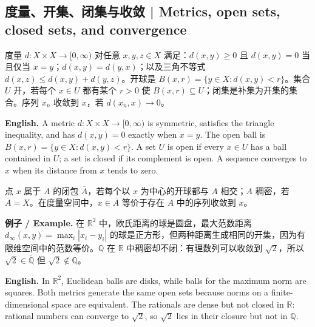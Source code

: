 \documentclass[UTF8,11pt,a4paper]{ctexart}
\newcommand{\EN}[1]{\par\noindent\textbf{English.} #1\par}
\let\APSsubsection\subsection
\renewcommand{\subsection}[1]{\Needspace{6\baselineskip}\APSsubsection{#1}}
\newcommand{\EX}[2]{\par\noindent\textbf{例子 / Example.} #1\par\EN{#2}}
\begin{document}
\subsection{度量、开集、闭集与收敛 | Metrics, open sets, closed sets, and convergence}
\noindent 度量 $d:X\times X\to[0,\infty)$ 对任意 $x,y,z\in X$ 满足：$d(x,y)\ge0$ 且 $d(x,y)=0$ 当且仅当 $x=y$；$d(x,y)=d(y,x)$；以及三角不等式 $d(x,z)\le d(x,y)+d(y,z)$。开球是 $B(x,r)=\{y\in X:d(x,y)<r\}$。集合 $U$ 开，若每个 $x\in U$ 都有某个 $r>0$ 使 $B(x,r)\subseteq U$；闭集是补集为开集的集合。序列 $x_n$ 收敛到 $x$，若 $d(x_n,x)\to0$。
\EN{A metric $d:X\times X\to[0,\infty)$ is symmetric, satisfies the triangle inequality, and has $d(x,y)=0$ exactly when $x=y$. The open ball is $B(x,r)=\{y\in X:d(x,y)<r\}$. A set $U$ is open if every $x\in U$ has a ball contained in $U$; a set is closed if its complement is open. A sequence converges to $x$ when its distance from $x$ tends to zero.}
\noindent 点 $x$ 属于 $A$ 的闭包 $\overline A$，若每个以 $x$ 为中心的开球都与 $A$ 相交；$A$ 稠密，若 $\overline A=X$。在度量空间中，$x\in\overline A$ 等价于存在 $A$ 中的序列收敛到 $x$。
\EX{在 $\mathbb R^2$ 中，欧氏距离的球是圆盘，最大范数距离 $d_\infty(x,y)=\max_i|x_i-y_i|$ 的球是正方形，但两种距离生成相同的开集，因为有限维空间中的范数等价。$\mathbb Q$ 在 $\mathbb R$ 中稠密却不闭：有理数列可以收敛到 $\sqrt2$，所以 $\sqrt2\in\overline{\mathbb Q}$ 但 $\sqrt2\notin\mathbb Q$。}{In $\mathbb R^2$, Euclidean balls are disks, while balls for the maximum norm are squares. Both metrics generate the same open sets because norms on a finite-dimensional space are equivalent. The rationals are dense but not closed in $\mathbb R$: rational numbers can converge to $\sqrt2$, so $\sqrt2$ lies in their closure but not in $\mathbb Q$.}
\end{document}
